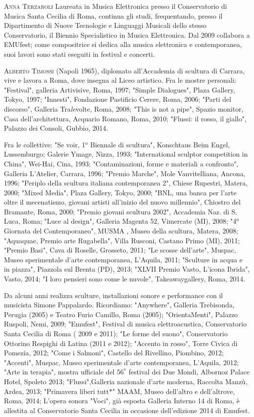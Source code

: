 \documentclass[9pt, twoside, a5paper]{extreport}
\newcommand{\biografia}[2]{%
\noindent \textsc{#1} %
#2 %
\medskip
}%
\begin{document}
\begin{multicols}{2}
\biografia{Anna Terzaroli}{Laureata in Musica Elettronica presso il Conservatorio di Musica Santa Cecilia di Roma, continua gli studi, frequentando, presso il Dipartimento di Nuove Tecnologie e Linguaggi Musicali dello stesso Conservatorio, il Biennio Specialistico in Musica Elettronica. Dal 2009 collabora a EMUfest; come compositrice si dedica alla musica elettronica e contemporanea, suoi lavori sono stati eseguiti in festival e concerti.}

\biografia{Alberto Timossi}{(Napoli 1965), diplomato all'Accademia di scultura di Carrara, vive e lavora a Roma, dove insegna al Liceo artistico.
Fra le mostre personali:
"Festival", galleria Artivisive, Roma, 1997;
"Simple Dialogues", Plaza Gallery, Tokyo, 1997;
"Innesti", Fondazione Pastificio Cerere, Roma, 2006;
"Parti del discorso", Galleria Tra\textit{le}volte, Roma, 2008;
"This is not a pipe", Spazio monitor, Casa dell'architettura, Acquario Romano, Roma, 2010;
"Flussi: il rosso, il giallo", Palazzo dei Consoli, Gubbio, 2014.

Fra le collettive:
"Se voir, 1$^o$ Biennale di scultura", Konschtaus Beim Engel, Lussemburgo; Galerie Ymage, Nizza, 1993;
"International sculptor competition in China", Wei-Hai, Cina, 1993;
"Contaminazioni, forme e materiali a confronto", Galleria L'Atelier, Carrara, 1996;
"Premio Marche", Mole Vanvitelliana, Ancona, 1996;
"Periplo della scultura italiana contemporanea 2", Chiese Rupestri, Matera, 2000;
"Mixed Media", Plaza Gallery, Tokyo, 2000;
"BNL, una banca per l'arte oltre il mecenatismo, giovani artisti all'inizio del nuovo millennio", Chiostro del
Bramante, Roma, 2000;
"Premio giovani scultura 2002", Accademia Naz. di S. Luca, Roma;
"Luce al design", Galleria Magenta 52, Vimercate (MI), 2008;
"4$^a$ Giornata del Contemporaneo", MUSMA , Museo della scultura, Matera, 2008;
"Aquaquae, Premio arte Rugabella", Villa Rusconi, Castano Primo (MI), 2011;
"Premio Basi", Cava di Roselle, Grosseto, 2011;
"Le scosse dell'arte", Muspac, Museo sperimentale d'arte contemporanea, L'Aquila, 2011;
"Sculture in acqua e in piazza", Piazzola sul Brenta (PD), 2013;
"XLVII Premio Vasto, L'icona Ibrida", Vasto, 2014;
"I loro pensieri sono come le nuvole", Takeawaygallery, Roma, 2014.

Da alcuni anni realizza sculture, installazioni sonore e performance con il musicista Simone Pappalardo. Ricordiamo:
"Anywhere", Galleria Trebisonda, Perugia (2005) e Teatro Furio Camillo, Roma (2005);
"OrientaMenti", Palazzo Ruspoli, Nemi, 2009;
"Emufest", Festival di musica elettroacustica, Conservatorio Santa Cecilia di Roma ( 2009 e 2011);
"Le forme del suono", Conservatorio Ottorino Respighi di Latina (2011 e 2012);
"Accento in rosso", Torre Civica di Pomezia, 2012;
"Come i Salmoni", Castello del Rivellino, Piombino, 2012;
"Accenti", Muspac, Museo sperimentale d'arte contemporanea, L'Aquila, 2012;
"Arte in terapia", mostra ufficiale del 56$^*$ festival dei Due Mondi, Albornoz Palace Hotel, Spoleto 2013;
"Flussi",Galleria nazionale d'arte moderna, Raccolta Manzù, Ardea, 2013;
"Primavera liberi tutt$\ast$" MAAM, Museo dell'altro e dell'altrove, Roma, 2014;
L'opera sonora "Voci", già esposta Galleria Interno 14 di Roma, è allestita al Conservatorio Santa Cecilia in
occasione dell'edizione 2014 di Emufest.}


\end{multicols}
\end{document}
